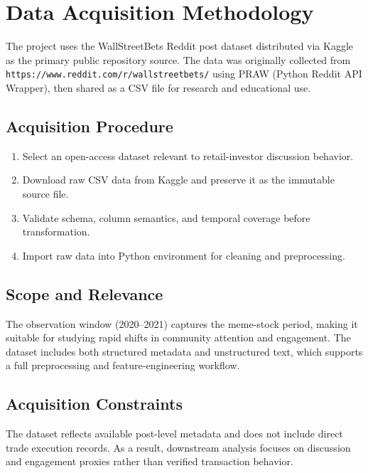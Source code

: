 \section{Data Acquisition Methodology}

The project uses the WallStreetBets Reddit post dataset distributed via Kaggle as the primary public repository source. The data was originally collected from \texttt{https://www.reddit.com/r/wallstreetbets/} using PRAW (Python Reddit API Wrapper), then shared as a CSV file for research and educational use.

\subsection{Acquisition Procedure}
\begin{enumerate}
  \item Select an open-access dataset relevant to retail-investor discussion behavior.
  \item Download raw CSV data from Kaggle and preserve it as the immutable source file.
  \item Validate schema, column semantics, and temporal coverage before transformation.
  \item Import raw data into Python environment for cleaning and preprocessing.
\end{enumerate}

\subsection{Scope and Relevance}
The observation window (2020--2021) captures the meme-stock period, making it suitable for studying rapid shifts in community attention and engagement. The dataset includes both structured metadata and unstructured text, which supports a full preprocessing and feature-engineering workflow.

\subsection{Acquisition Constraints}
The dataset reflects available post-level metadata and does not include direct trade execution records. As a result, downstream analysis focuses on discussion and engagement proxies rather than verified transaction behavior.

